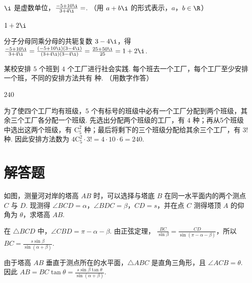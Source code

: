 \begin{problem}
\(\i\) 是虚数单位，\( \frac{-5 + 10\i}{3 + 4\i} = \)\fillinblank{}. （用 \(a + b\i\) 的形式表示，\(a\)，\(b \in \R\)）
\end{problem}

\begin{answer}
\(1+2\i\)
\end{answer}

\begin{solution}
分子分母同乘分母的共轭复数 \(3-4\i\)，得
\(\frac{-5+10\i}{3+4\i}=\frac{(-5+10\i)(3-4\i)}{(3+4\i)(3-4\i)}=\frac{25+50\i}{25}=1+2\i\).
\end{solution}

\begin{problem}
某校安排 \(5\) 个班到 \(4\) 个工厂进行社会实践. 每个班去一个工厂，每个工厂至少安排一个班，不同的安排方法共有\fillinblank{} 种. （用数字作答）
\end{problem}

\begin{answer}
\(240\)
\end{answer}

\begin{solution}
为了使四个工厂均有班级，5 个有标号的班级中必有一个工厂分配到两个班级，其余三个工厂各分配一个班级. 先选出分配两个班级的工厂，有 \(4\) 种；再从5个班级中选出这两个班级，有 \(\mathrm C_5^2\) 种；最后将剩下的三个班级分配给其余三个工厂，有 \(3!\) 种. 因此安排方法数为
\(4\mathrm C_5^2\cdot3!=4\cdot10\cdot6=240\).
\end{solution}

\section{解答题}

\begin{problem}
如图，测量河对岸的塔高 \(AB\) 时，可以选择与塔底 \(B\) 在同一水平面内的两个测点 \(C\) 与 \(D\). 现测得 \(\angle BCD = \alpha\)，\(\angle BDC = \beta\)，\(CD = s\)，并在点 \(C\) 测得塔顶 \(A\) 的仰角为 \(\theta\)，求塔高 \(AB\).

\end{problem}

\begin{solution}
在 \(\triangle BCD\) 中，\(\angle CBD=\pi-\alpha-\beta\). 由正弦定理，
\(\frac{BC}{\sin\beta}=\frac{CD}{\sin(\pi-\alpha-\beta)}\)，所以
\(BC=\frac{s\sin\beta}{\sin(\alpha+\beta)}\).

由于塔高 \(AB\) 垂直于测点所在的水平面，\(\triangle ABC\) 是直角三角形，且 \(\angle ACB=\theta\). 因此
\(AB=BC\tan\theta=\frac{s\sin\beta\tan\theta}{\sin(\alpha+\beta)}\).
\end{solution}

